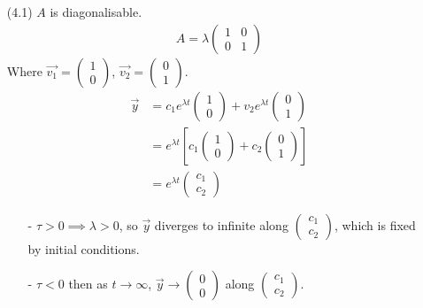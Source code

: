 \documentclass[10pt]{scrartcl}
\renewcommand{\l}{\lambda}
\begin{document}
\begin{enumerate}
\item[\textsc{(4.1)}] $A$ is diagonalisable. 
\begin{align*}
  A = \l\begin{pmatrix}
  1 & 0 \\ 0 & 1
\end{pmatrix}
\end{align*}
Where $\vec{v_1} = 
\begin{pmatrix}
  1 \\ 0
\end{pmatrix}$, $\vec{v_2} = 
\begin{pmatrix}
  0 \\ 1
\end{pmatrix}$. 
\begin{align*}
  \vec{y} &= c_1e^{\l t}
  \begin{pmatrix}
  1 \\ 0
\end{pmatrix}
+ v_2e^{\l t}
\begin{pmatrix}
  0 \\ 1
\end{pmatrix}\\
&= e^{\l t}\left[
c_1\begin{pmatrix}
  1 \\ 0
\end{pmatrix} + c_2
\begin{pmatrix}
  0\\1 
\end{pmatrix}
\right]\\
&= e^{\l t}\begin{pmatrix}
  c_1 \\ c_2
\end{pmatrix}
\end{align*}

\begin{enumerate}
  \item[-]$\tau > 0 \implies \lambda > 0$, so $\vec{y}$ diverges to infinite along $\begin{pmatrix}
  c_1 \\ c_2
\end{pmatrix}$, which is fixed by initial conditions. 
\item[-] $\tau < 0$ then as $t \to \infty$, $\vec{y} \to \begin{pmatrix}
  0 \\ 0
\end{pmatrix}$ along 
$\begin{pmatrix}
  c_1 \\ c_2
\end{pmatrix}$. 
\end{enumerate}


\end{enumerate}
\end{document}
